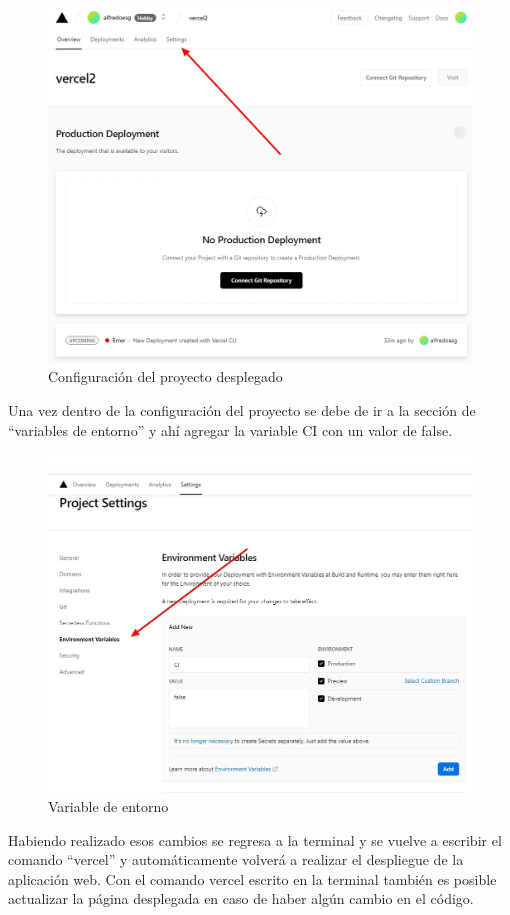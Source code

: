 \documentclass[12pt, a4paper, titlepage]{article}
\begin{document}
	\begin{figure}[H]
		\includegraphics[width=12cm]{./Imagenes/Despliegue/Ajustes.jpeg}
		\centering 
		\caption{Configuración del proyecto desplegado}
	\end{figure}
	Una vez dentro de la configuración del proyecto se debe de ir a la sección de “variables de entorno” y ahí agregar la variable CI con un valor de false.
	\begin{figure}[H]
		\includegraphics[width=12cm]{./Imagenes/Despliegue/Varaiblesentorno.jpeg}
		\centering 
		\caption{Variable de entorno}
	\end{figure}
	Habiendo realizado esos cambios se regresa a la terminal y se vuelve a escribir el comando “vercel” y automáticamente volverá a realizar el despliegue de la aplicación web. Con el comando vercel escrito en la terminal también es posible actualizar la página desplegada en caso de haber algún cambio en el código.\\\\
\end{document}
